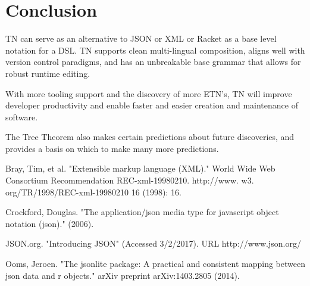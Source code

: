 \documentclass[journal]{IEEEtran}
\begin{document}
\section{Conclusion}

TN can serve as an alternative to JSON or XML or Racket as a base level notation for a DSL. TN supports clean multi-lingual composition, aligns well with version control paradigms, and has an unbreakable base grammar that allows for robust runtime editing.

With more tooling support and the discovery of more ETN's, TN will improve developer productivity and enable faster and easier creation and maintenance of software.

The Tree Theorem also makes certain predictions about future discoveries, and provides a basis on which to make many more predictions.

\begin{thebibliography}{4}

Bray, Tim, et al. "Extensible markup language (XML)." World Wide Web Consortium Recommendation REC-xml-19980210. http://www. w3. org/TR/1998/REC-xml-19980210 16 (1998): 16.

Crockford, Douglas. "The application/json media type for javascript object notation (json)." (2006).

JSON.org. "Introducing JSON" (Accessed 3/2/2017). URL http://www.json.org/

Ooms, Jeroen. "The jsonlite package: A practical and consistent mapping between json data and r objects." arXiv preprint arXiv:1403.2805 (2014).

\end{thebibliography}

\ifCLASSOPTIONcaptionsoff
  \newpage
\fi
\end{document}

